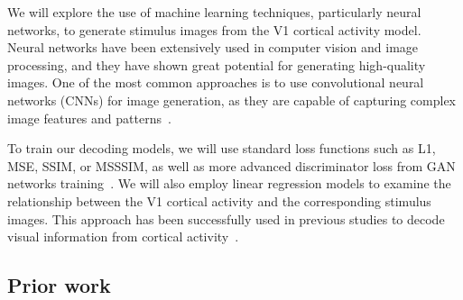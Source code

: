 We will explore the use of machine learning techniques, particularly neural networks, to generate stimulus images from the V1 cortical activity model. Neural networks have been extensively used in computer vision and image processing, and they have shown great potential for generating high-quality images. One of the most common approaches is to use convolutional neural networks (CNNs) for image generation, as they are capable of capturing complex image features and patterns~\citep{radford2015unsupervised, xu2018attngan}.

To train our decoding models, we will use standard loss functions such as L1, MSE, SSIM, or MSSSIM, as well as more advanced discriminator loss from GAN networks training~\citep{goodfellow2014generative, goodfellow2020generative}. We will also employ linear regression models to examine the relationship between the V1 cortical activity and the corresponding stimulus images. This approach has been successfully used in previous studies to decode visual information from cortical activity~\citep{kay2008identifying}.


\subsection*{Prior work}

